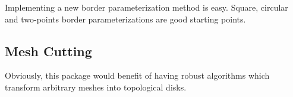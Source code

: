 Implementing a new border parameterization method is easy.
Square, circular and two-points border parameterizations are good starting points.


\subsection{Mesh Cutting}

Obviously, this package would benefit of having robust algorithms
which transform arbitrary meshes into topological disks.

